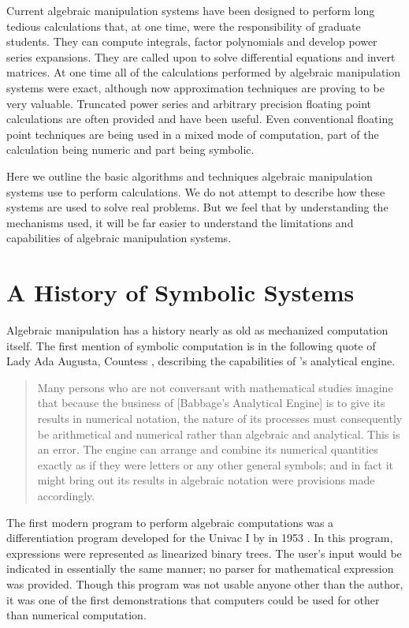 Current algebraic manipulation systems have been designed to perform long
tedious calculations that, at one time, were the responsibility of graduate
students.  They can compute integrals, factor polynomials and develop power
series expansions.  They are called upon to solve differential equations
and invert matrices.  At one time all of the calculations performed by
algebraic manipulation systems were exact, although now approximation
techniques are proving to be very valuable.  Truncated power series and
arbitrary precision floating point calculations are often provided and have
been useful.  Even conventional floating point techniques are being used in
a mixed mode of computation, part of the calculation being numeric and part
being symbolic.

\medskip

Here we outline the basic algorithms and techniques algebraic manipulation
systems use to perform calculations.  We do not attempt to describe how
these systems are used to solve real problems.  But we feel that by
understanding the mechanisms used, it will be far easier to understand the
limitations and capabilities of algebraic manipulation systems.

\section{A History of Symbolic Systems}

Algebraic manipulation has a history nearly as old as mechanized
computation itself.  The first mention of symbolic computation is in
the following quote of Lady Ada Augusta, Countess {\Lovelace},
describing the capabilities of {\Babbage}'s analytical engine.

\begin{quotation}
Many persons who are not conversant with mathematical studies imagine that
because the business of [Babbage's Analytical Engine] is to give its
results in numerical notation, the nature of its processes must
consequently be arithmetical and numerical rather than algebraic and
analytical.  This is an error.  The engine can arrange and combine its
numerical quantities exactly as if they were letters or any other general
symbols; and in fact it might bring out its results in algebraic notation
were provisions made accordingly.
\end{quotation}

The first modern program to perform algebraic computations was a
differentiation program developed for the Univac I by {\Kahrimanian}in
1953 \cite{Kahrimanian53}.  In this program, expressions were
represented as linearized binary trees.  The user's input would be
indicated in essentially the same manner; no parser for mathematical
expression was provided.  Though this program was not usable anyone
other than the author, it was one of the first demonstrations that
computers could be used for other than numerical computation.

